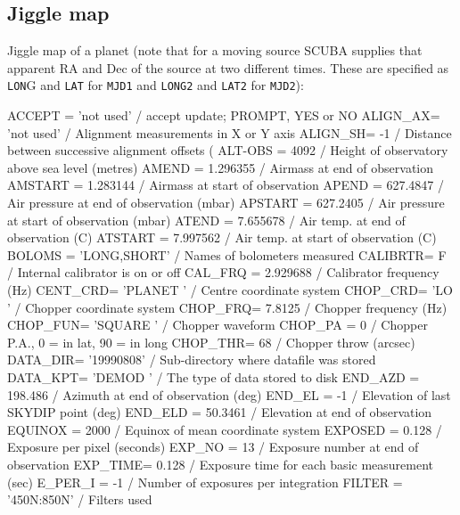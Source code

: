\documentclass[twoside,11pt,nolof]{starlink}
\begin{document}
\subsection{Jiggle map}

Jiggle map of a planet (note that for a moving source SCUBA supplies that
apparent RA and Dec of the source at two different times. These are specified
as \texttt{LON}G and \texttt{LAT} for \texttt{MJD1} and \texttt{LONG2} and
\texttt{LAT2} for \texttt{MJD2}):

\begin{small}
\begin{terminalv}
ACCEPT  = 'not used'           / accept update; PROMPT, YES or NO
ALIGN_AX= 'not used'           / Alignment measurements in X or Y axis
ALIGN_SH=                   -1 / Distance between successive alignment offsets (
ALT-OBS =                 4092 / Height of observatory above sea level (metres)
AMEND   =             1.296355 / Airmass at end of observation
AMSTART =             1.283144 / Airmass at start of observation
APEND   =             627.4847 / Air pressure at end of observation (mbar)
APSTART =             627.2405 / Air pressure at start of observation (mbar)
ATEND   =             7.655678 / Air temp. at end of observation (C)
ATSTART =             7.997562 / Air temp. at start of observation (C)
BOLOMS  = 'LONG,SHORT'         / Names of bolometers measured
CALIBRTR=                    F / Internal calibrator is on or off
CAL_FRQ =             2.929688 / Calibrator frequency (Hz)
CENT_CRD= 'PLANET  '           / Centre coordinate system
CHOP_CRD= 'LO      '           / Chopper coordinate system
CHOP_FRQ=               7.8125 / Chopper frequency (Hz)
CHOP_FUN= 'SQUARE  '           / Chopper waveform
CHOP_PA =                    0 / Chopper P.A., 0 = in lat, 90 = in long
CHOP_THR=                   68 / Chopper throw (arcsec)
DATA_DIR= '19990808'           / Sub-directory where datafile was stored
DATA_KPT= 'DEMOD   '           / The type of data stored to disk
END_AZD =              198.486 / Azimuth at end of observation (deg)
END_EL  =                   -1 / Elevation of last SKYDIP point (deg)
END_ELD =              50.3461 / Elevation at end of observation
EQUINOX =                 2000 / Equinox of mean coordinate system
EXPOSED =                0.128 / Exposure per pixel (seconds)
EXP_NO  =                   13 / Exposure number at end of observation
EXP_TIME=                0.128 / Exposure time for each basic measurement (sec)
E_PER_I =                   -1 / Number of exposures per integration
FILTER  = '450N:850N'          / Filters used

\end{terminalv}
\end{small}
\end{document}
